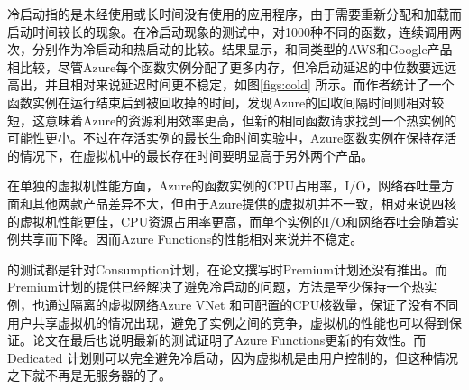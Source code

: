 冷启动指的是未经使用或长时间没有使用的应用程序，由于需要重新分配和加载而启动时间较长的现象。在冷启动现象的测试中，\cite{wang2018peeking}对1000种不同的函数，连续调用两次，分别作为冷启动和热启动的比较。结果显示，和同类型的AWS和Google产品相比较，尽管Azure每个函数实例分配了更多内存，但冷启动延迟的中位数要远远高出，并且相对来说延迟时间更不稳定，如图\ref{figs:cold} 所示。而作者统计了一个函数实例在运行结束后到被回收掉的时间，发现Azure的回收间隔时间则相对较短，这意味着Azure的资源利用效率更高，但新的相同函数请求找到一个热实例的可能性更小。不过在存活实例的最长生命时间实验中，Azure函数实例在保持存活的情况下，在虚拟机中的最长存在时间要明显高于另外两个产品。

在单独的虚拟机性能方面，Azure的函数实例的CPU占用率，I/O，网络吞吐量方面和其他两款产品差异不大，但由于Azure提供的虚拟机并不一致，相对来说四核的虚拟机性能更佳，CPU资源占用率更高，而单个实例的I/O和网络吞吐会随着实例共享而下降。因而Azure Functions的性能相对来说并不稳定。

\cite{wang2018peeking}的测试都是针对Consumption计划，在论文撰写时Premium计划还没有推出。而Premium计划的提供已经解决了避免冷启动的问题，方法是至少保持一个热实例，也通过隔离的虚拟网络Azure VNet 和可配置的CPU核数量，保证了没有不同用户共享虚拟机的情况出现，避免了实例之间的竞争，虚拟机的性能也可以得到保证。论文在最后也说明最新的测试证明了Azure Functions更新的有效性。而Dedicated 计划则可以完全避免冷启动，因为虚拟机是由用户控制的，但这种情况之下就不再是无服务器的了。

